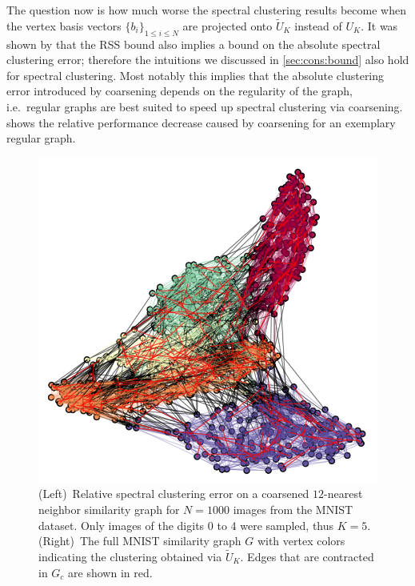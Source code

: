 The question now is how much worse the spectral clustering results become when the vertex basis vectors ${\{ b_i \}}_{1 \leq i \leq N}$ are projected onto $\widetilde{U}_K$ instead of $U_K$.
It was shown by \citet[Coroll.~5.1]{Loukas2018} that the RSS bound also implies a bound on the absolute spectral clustering error;
therefore the intuitions we discussed in \cref{sec:cons:bound} also hold for spectral clustering.
Most notably this implies that the absolute clustering error introduced by coarsening depends on the regularity of the graph, i.e.\ regular graphs are best suited to speed up spectral clustering via coarsening.
 shows the relative performance decrease caused by coarsening for an exemplary regular graph.
\begin{figure}[ht]
	\centering
	\quad\includegraphics[width=0.29\linewidth]{gfx/cons/mnistGraph.png}
	\caption{%
		(Left)~Relative spectral clustering error on a coarsened $12$-nearest neighbor similarity graph for $N=1000$ images from the MNIST dataset.
		Only images of the digits 0 to 4 were sampled, thus $K = 5$.
		(Right)~The full MNIST similarity graph $G$ with vertex colors indicating the clustering obtained via $\widetilde{U}_K$. Edges that are contracted in $G_c$ are shown in red.
	}\label{fig:cons:mnist}
\end{figure}
\vspace{-0.7cm}
